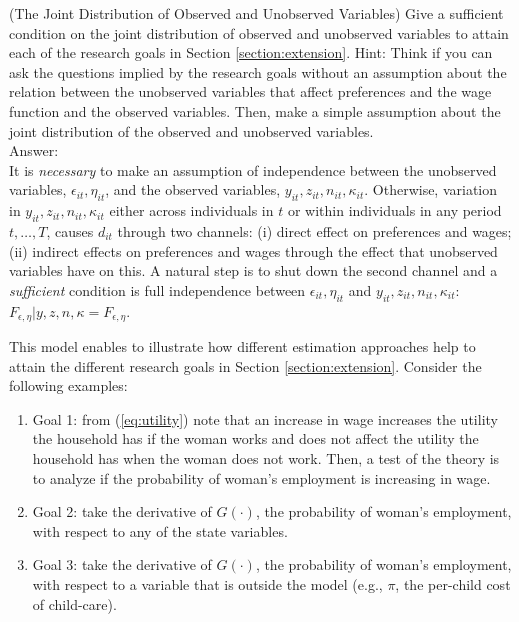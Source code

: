 \begin{exercise} (The Joint Distribution of Observed and Unobserved Variables)
Give a sufficient condition on the joint distribution of observed and unobserved variables to attain each of the research goals in Section \ref{section:extension}. Hint: Think if you can ask the questions implied by the research goals without an assumption about the relation between the unobserved variables that affect preferences and the wage function and the observed variables. Then, make a simple assumption about the joint distribution of the observed and unobserved variables.\\
\noindent Answer:\\
\noindent It is \emph{necessary} to make an assumption of independence between the unobserved variables, $\epsilon_{it}, \eta_{it}$, and the observed variables, $y_{it}, z_{it}, n_{it}, \kappa_{it}$. Otherwise, variation in $y_{it}, z_{it}, n_{it}, \kappa_{it}$ either across individuals in $t$ or within individuals in any period $t, \ldots, T$, causes $d_{it}$ through two channels: (i) direct effect on preferences and  wages; (ii) indirect effects on preferences and wages through the effect that unobserved variables have on this. A natural step is to shut down the second channel and a \emph{sufficient} condition is full independence between $\epsilon_{it}, \eta_{it}$ and  $y_{it}, z_{it}, n_{it}, \kappa_{it}$: $F_{\epsilon, \eta}|y, z, n, \kappa = F_{\epsilon,\eta}$.
\end{exercise}

\indent This model enables to illustrate how different estimation approaches help to attain the different research goals in Section \ref{section:extension}. Consider the following examples:
\begin{enumerate}
\item Goal 1: from (\eqref{eq:utility}) note that an increase in wage increases the utility the household has if the woman works and does not affect the utility the household has when the woman does not work. Then, a test of the theory is to analyze if the probability of woman's employment is increasing in wage. 
\item Goal 2: take the derivative of $G(\cdot)$, the probability of woman's employment, with respect to any of the state variables.
\item Goal 3: take the derivative of $G(\cdot)$, the probability of woman's employment, with respect to a variable that is outside the model (e.g., $\pi$, the per-child cost of child-care). 
\end{enumerate}

